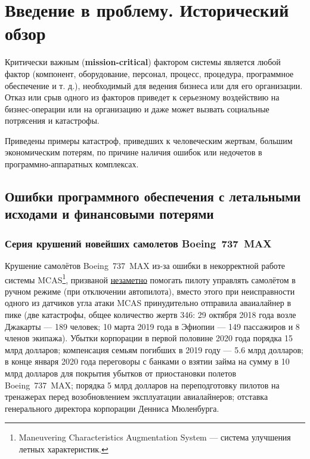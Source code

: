 \chapter{Введение в проблему. Исторический обзор}\label{ch:ch1}

Критически важным (\textbf{mission-critical}) фактором системы является любой фактор
(компонент, оборудование, персонал, процесс, процедура, программное обеспечение и т. д.),
необходимый для ведения бизнеса или для его организации.
Отказ или срыв одного из факторов приведет к серьезному воздействию на бизнес-операции или на организацию
и даже может вызвать социальные потрясения и катастрофы.

Приведены примеры катастроф, приведших к человеческим жертвам, большим экономическим потерям,
по причине наличия ошибок или недочетов в программно-аппаратных комплексах.


\section{Ошибки программного обеспечения с летальными исходами и финансовыми потерями}


\subsection{Серия крушений новейших самолетов Boeing~737~MAX}

Крушение самолётов Boeing~737~MAX из-за ошибки в некорректной работе системы MCAS\footnote{Maneuvering Characteristics Augmentation System ---
    система улучшения летных характеристик.},
призваной \underline{незаметно} помогать пилоту управлять самолётом в ручном режиме (при отключении автопилота),
вместо этого при неисправности одного из датчиков угла атаки MCAS принудительно отправила аваиалайнер в пике
(две катастрофы, общее количество жертв 346:
    29 октября 2018 года возле Джакарты --- 189 человек;
    10 марта 2019 года в Эфиопии --- 149 пассажиров и 8 членов экипажа).
Убытки корпорации в первой половине 2020 года порядка 15 млрд долларов;
компенсация семьям погибших в 2019 году --- 5.6 млрд долларов;
в конце января 2020 года переговоры с банками о взятии займа на сумму в 10 млрд долларов для покрытия убытков от приостановки полетов Boeing~737~MAX;
порядка 5 млрд долларов на переподготовку пилотов на тренажерах перед возобновлением эксплуатации авиалайнеров;
отставка генерального директора корпорации Денниса Мюленбурга.


